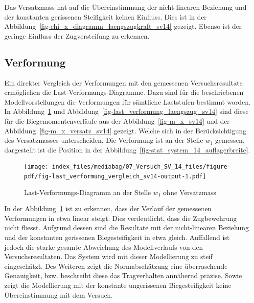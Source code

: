 \documentclass[
  12pt,
  letterpaper,
  egregdoesnotlikesansseriftitles]{scrreprt}
\begin{document}
Das Versatzmass hat auf die Übereinstimmung der nicht-linearen Beziehung
und der konstanten gerissenen Steifigkeit keinen Einfluss. Dies ist in
der Abbildung~\ref{fig-chi_x_diagramm_laengszugkraft_sv14} gezeigt.
Ebenso ist der geringe Einfluss der Zugversteifung zu erkennen.

\hypertarget{verformung-1}{%
\subsection{Verformung}\label{verformung-1}}

Ein direkter Vergleich der Verformungen mit den gemessenen
Versuchsresultate ermöglichen die Last-Verformungs-Diagramme. Dazu sind
für die beschriebenen Modellvorstellungen die Verformungen für sämtliche
Laststufen bestimmt worden. In
Abbildung~\ref{fig-last_verformung_vergleich_sv14} und
Abbildung~\ref{fig-last_verformung_laengszug_sv14} sind diese für die
Biegemomentenverläufe aus der Abbildung~\ref{fig-m_x_sv14} und der
Abbildung~\ref{fig-m_x_versatz_sv14} gezeigt. Welche sich in der
Berücksichtigung des Versatzmasses unterscheiden. Die Verformung ist an
der Stelle \(w_1\) gemessen, dargestellt ist die Position in der
Abbildung~\ref{fig-stat_system_14_auflagerbreite}.

\begin{figure}[H]

{\centering \texttt{[image: index\_files/mediabag/07\_Versuch\_SV\_14\_files/figure-pdf/fig-last\_verformung\_vergleich\_sv14-output-1.pdf]}

}

\caption{\label{fig-last_verformung_vergleich_sv14}Last-Verformungs-Diagramm
an der Stelle \(w_1\) ohne Versatzmass}

\end{figure}

In der Abbildung~\ref{fig-last_verformung_vergleich_sv14} ist zu
erkennen, dass der Verlauf der gemessenen Verformungen in etwa linear
steigt. Dies verdeutlicht, dass die Zugbewehrung nicht fliesst. Aufgrund
dessen sind die Resultate mit der nicht-linearen Beziehung und der
konstanten gerissenen Biegesteifigkeit in etwa gleich. Auffallend ist
jedoch die starke gesamte Abweichung des Modellverlaufs von den
Versuchsresultaten. Das System wird mit dieser Modellierung zu steif
eingeschätzt. Des Weiteren zeigt die Normabschätzung eine überraschende
Genauigkeit, bzw. beschreibt diese das Tragverhalten annähernd präzise.
Sowie zeigt die Modellierung mit der konstante ungerissenen
Biegesteifigkeit keine Übereinstimmung mit dem Versuch.
\end{document}
